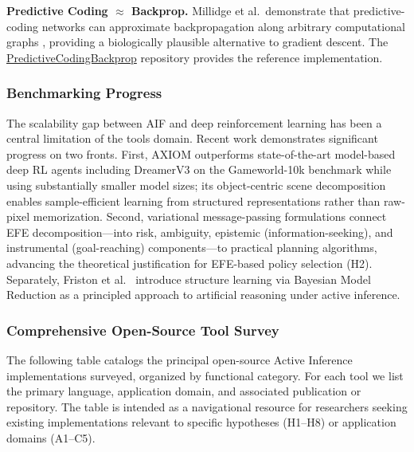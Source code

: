 \documentclass[
  english,
]{article}
\begin{document}
{{{{{{{{{{{{{{{{\textbf{Predictive Coding \(\approx\) Backprop.} Millidge et
al.~demonstrate that predictive-coding networks can approximate
backpropagation along arbitrary computational graphs
\citep{millidge2022predictive}, providing a biologically plausible
alternative to gradient descent. The
\href{https://github.com/BerenMillidge/PredictiveCodingBackprop}{PredictiveCodingBackprop}
repository provides the reference implementation.

\subsubsection{Benchmarking Progress}\label{benchmarking-progress}

The scalability gap between AIF and deep reinforcement learning has been
a central limitation of the tools domain. Recent work demonstrates
significant progress on two fronts. First, AXIOM \citep{heins2025axiom}
outperforms state-of-the-art model-based deep RL agents including
DreamerV3 on the Gameworld-10k benchmark while using substantially
smaller model sizes; its object-centric scene decomposition enables
sample-efficient learning from structured representations rather than
raw-pixel memorization. Second, variational message-passing formulations
\citep{champion2021realizing} connect EFE decomposition---into risk,
ambiguity, epistemic (information-seeking), and instrumental
(goal-reaching) components---to practical planning algorithms, advancing
the theoretical justification for EFE-based policy selection (H2).
Separately, Friston et al.~\citep{friston2025active} introduce structure
learning via Bayesian Model Reduction as a principled approach to
artificial reasoning under active inference.

\FloatBarrier

\subsubsection{Comprehensive Open-Source Tool
Survey}\label{comprehensive-open-source-tool-survey}

The following table catalogs the principal open-source Active Inference
implementations surveyed, organized by functional category. For each
tool we list the primary language, application domain, and associated
publication or repository. The table is intended as a navigational
resource for researchers seeking existing implementations relevant to
specific hypotheses (H1--H8) or application domains (A1--C5).

}}}}}}}}}}}}}}}}
\end{document}
